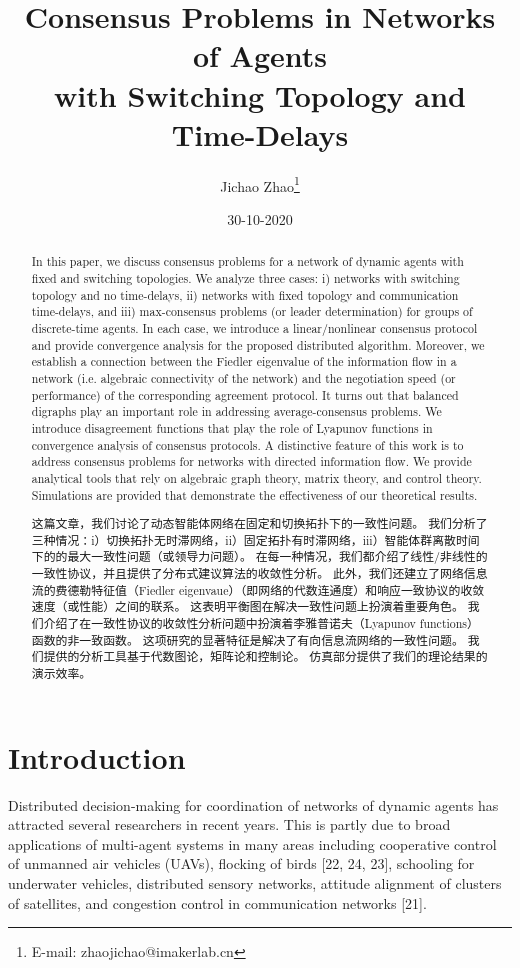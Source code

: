 \documentclass{article}
\title{Consensus Problems in Networks of Agents\\ with Switching Topology and Time-Delays}
\author{ Jichao Zhao\thanks{E-mail: zhaojichao@imakerlab.cn}}
\date{30-10-2020}
\begin{document}
\maketitle

\begin{abstract}
{\color[gray]{0.5}
In this paper, we discuss consensus problems for a network of dynamic agents with ﬁxed and switching topologies. 
We analyze three cases: i) networks with switching topology and no time-delays, ii) networks with ﬁxed topology and communication time-delays, and iii) max-consensus problems (or leader determination) for groups of discrete-time agents. 
In each case, we introduce a linear/nonlinear consensus protocol and provide convergence analysis for the proposed distributed algorithm. 
Moreover, we establish a connection between the Fiedler eigenvalue of the information ﬂow in a network (i.e. algebraic connectivity of the network) and the negotiation speed (or performance) of the corresponding agreement protocol. 
It turns out that balanced digraphs play an important role in addressing average-consensus problems. 
We introduce disagreement functions that play the role of Lyapunov functions in convergence analysis of consensus protocols. 
A distinctive feature of this work is to address consensus problems for networks with directed information ﬂow. 
We provide analytical tools that rely on algebraic graph theory, matrix theory, and control theory. 
Simulations are provided that demonstrate the eﬀectiveness of our theoretical results.
}

这篇文章，我们讨论了动态智能体网络在固定和切换拓扑下的一致性问题。
我们分析了三种情况：i）切换拓扑无时滞网络，ii）固定拓扑有时滞网络，iii）智能体群离散时间下的的最大一致性问题（或领导力问题）。
在每一种情况，我们都介绍了线性/非线性的一致性协议，并且提供了分布式建议算法的收敛性分析。
此外，我们还建立了网络信息流的费德勒特征值（Fiedler eigenvaue）（即网络的代数连通度）和响应一致协议的收敛速度（或性能）之间的联系。
这表明平衡图在解决一致性问题上扮演着重要角色。
我们介绍了在一致性协议的收敛性分析问题中扮演着李雅普诺夫（Lyapunov functions）函数的非一致函数。
这项研究的显著特征是解决了有向信息流网络的一致性问题。
我们提供的分析工具基于代数图论，矩阵论和控制论。
仿真部分提供了我们的理论结果的演示效率。
\end{abstract}

\clearpage
\tableofcontents

\clearpage
\section{Introduction}
{\color[gray]{0.5}
Distributed decision-making for coordination of networks of dynamic agents has attracted several researchers in recent years. 
This is partly due to broad applications of multi-agent systems in many areas including cooperative control of unmanned air vehicles (UAVs), ﬂocking of birds [22, 24, 23], schooling for underwater vehicles, distributed sensory networks, attitude alignment of clusters of satellites, and congestion control in communication networks [21].
}
\end{document}
